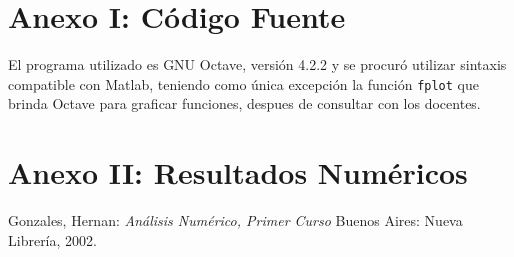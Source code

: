 \documentclass[11pt,a4paper]{article}
\begin{document}
\newpage
\appendix
\section{Anexo I: Código Fuente}

El programa utilizado es GNU Octave, versión 4.2.2 y se procuró utilizar sintaxis compatible con Matlab, teniendo como única excepción la función \texttt{fplot} que brinda Octave para graficar funciones, despues de consultar con los docentes.


\newpage


\newpage
\section{Anexo II: Resultados Numéricos}


{}
\renewcommand\refname{Bibliografía}
\begin{thebibliography}{9}

Gonzales, Hernan: 
\textit{Análisis Numérico, Primer Curso}
Buenos Aires: Nueva Librería, 2002.

\end{thebibliography}
\end{document}
